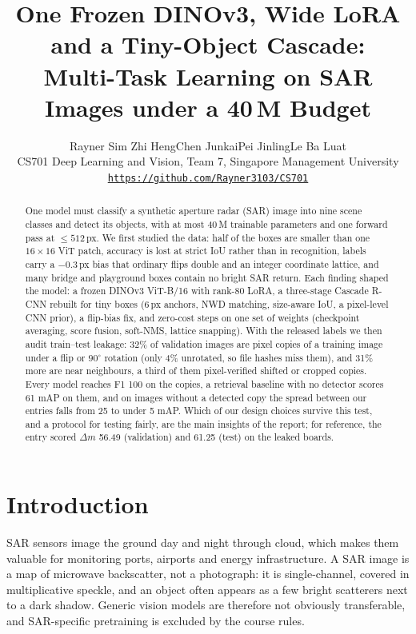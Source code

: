 \documentclass[10pt,twocolumn,letterpaper]{article}
\title{One Frozen DINOv3, Wide LoRA and a Tiny-Object Cascade:\\Multi-Task Learning on SAR Images under a 40\,M Budget}
\author{Rayner Sim Zhi Heng\qquad Chen Junkai\qquad Pei Jinling\qquad Le Ba Luat\\
CS701 Deep Learning and Vision, Team 7, Singapore Management University\\
{\tt\small \url{https://github.com/Rayner3103/CS701}}\vspace*{-6pt}
}
\newcommand{\dm}{\ensuremath{\Delta m}}
\begin{document}
\maketitle

\begin{abstract}
One model must classify a synthetic aperture radar (SAR) image into nine scene classes and detect its objects, with at most 40\,M trainable parameters and one forward pass at $\le512$\,px.
We first studied the data: half of the boxes are smaller than one $16{\times}16$ ViT patch, accuracy is lost at strict IoU rather than in recognition, labels carry a $-0.3$\,px bias that ordinary flips double and an integer coordinate lattice, and many bridge and playground boxes contain no bright SAR return.
Each finding shaped the model: a frozen DINOv3 ViT-B/16 with rank-80 LoRA, a three-stage Cascade R-CNN rebuilt for tiny boxes (6\,px anchors, NWD matching, size-aware IoU, a pixel-level CNN prior), a flip-bias fix, and zero-cost steps on one set of weights (checkpoint averaging, score fusion, soft-NMS, lattice snapping).
With the released labels we then audit train--test leakage: 32\% of validation images are pixel copies of a training image under a flip or $90^\circ$ rotation (only 4\% unrotated, so file hashes miss them), and 31\% more are near neighbours, a third of them pixel-verified shifted or cropped copies.
Every model reaches F1 100 on the copies, a retrieval baseline with no detector scores 61 mAP on them, and on images without a detected copy the spread between our entries falls from 25 to under 5 mAP. Which of our design choices survive this test, and a protocol for testing fairly, are the main insights of the report; for reference, the entry scored \dm{} 56.49 (validation) and 61.25 (test) on the leaked boards.
\end{abstract}

\section{Introduction}
\label{sec:intro}

SAR sensors image the ground day and night through cloud, which makes them valuable for monitoring ports, airports and energy infrastructure. A SAR image is a map of microwave backscatter, not a photograph: it is single-channel, covered in multiplicative speckle, and an object often appears as a few bright scatterers next to a dark shadow. Generic vision models are therefore not obviously transferable, and SAR-specific pretraining is excluded by the course rules.
\end{document}
